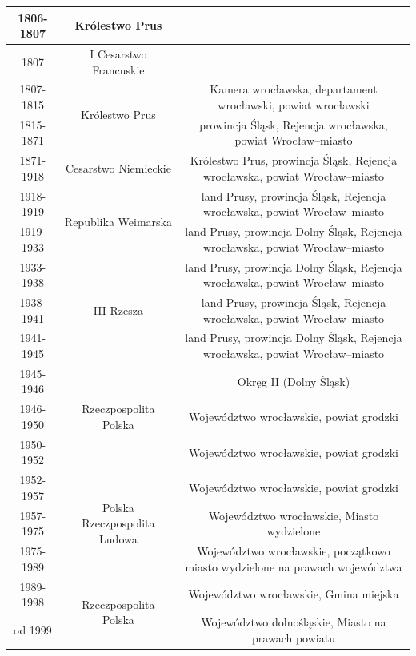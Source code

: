 \documentclass{article}
\begin{document}
\begin{table}[]
{\begin{tabular}{|c|c|c|c|}
1806-1807   & \multicolumn{2}{c|}{Królestwo Prus}   &   \\ \hline
1807        & \multicolumn{2}{c|}{I Cesarstwo Francuskie}   &   \\ \hline
1807-1815   & \multicolumn{2}{c|}{\multirow{2}{*}{Królestwo Prus}}  & Kamera wrocławska, departament wrocławski, powiat wrocławski  \\ \cline{1-1} \cline{4-4} 
1815-1871   & \multicolumn{2}{c|}{} & prowincja Śląsk, Rejencja wrocławska, powiat Wrocław–miasto   \\ \hline
1871-1918   & \multicolumn{2}{c|}{Cesarstwo Niemieckie} & Królestwo Prus, prowincja Śląsk, Rejencja wrocławska, powiat Wrocław–miasto   \\ \hline
1918-1919   & \multicolumn{2}{c|}{\multirow{2}{*}{Republika Weimarska}} & land Prusy, prowincja Śląsk, Rejencja wrocławska, powiat Wrocław–miasto   \\ \cline{1-1} \cline{4-4} 
1919-1933   & \multicolumn{2}{c|}{} & land Prusy, prowincja Dolny Śląsk, Rejencja wrocławska, powiat Wrocław–miasto \\ \hline
1933-1938   & \multicolumn{2}{c|}{\multirow{3}{*}{III Rzesza}}  & land Prusy, prowincja Dolny Śląsk, Rejencja wrocławska, powiat Wrocław–miasto \\ \cline{1-1} \cline{4-4} 
1938-1941   & \multicolumn{2}{c|}{} & land Prusy, prowincja Śląsk, Rejencja wrocławska, powiat Wrocław–miasto   \\ \cline{1-1} \cline{4-4} 
1941-1945   & \multicolumn{2}{c|}{} & land Prusy, prowincja Dolny Śląsk, Rejencja wrocławska, powiat Wrocław–miasto \\ \hline
1945-1946   & \multicolumn{2}{c|}{\multirow{3}{*}{Rzeczpospolita Polska}}   & Okręg II (Dolny Śląsk)    \\ \cline{1-1} \cline{4-4} 
1946-1950   & \multicolumn{2}{c|}{} & Województwo wrocławskie, powiat grodzki   \\ \cline{1-1} \cline{4-4} 
1950-1952   & \multicolumn{2}{c|}{} & Województwo wrocławskie, powiat grodzki   \\ \hline
1952-1957   & \multicolumn{2}{c|}{\multirow{3}{*}{Polska Rzeczpospolita Ludowa}} & Województwo wrocławskie, powiat grodzki  \\ \cline{1-1} \cline{4-4} 
1957-1975   & \multicolumn{2}{c|}{} & Województwo wrocławskie, Miasto wydzielone    \\ \cline{1-1} \cline{4-4} 
1975-1989   & \multicolumn{2}{c|}{} & Województwo wrocławskie, początkowo miasto wydzielone na prawach województwa  \\ \hline
1989-1998   & \multicolumn{2}{c|}{\multirow{2}{*}{Rzeczpospolita Polska}}   & Województwo wrocławskie, Gmina miejska    \\ \cline{1-1} \cline{4-4} 
od 1999     & \multicolumn{2}{c|}{} & Województwo dolnośląskie, Miasto na prawach powiatu   \\ \hline
\end{tabular}%
}
\end{table}
\end{document}
